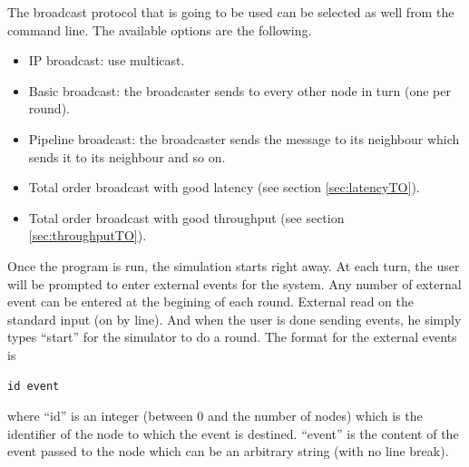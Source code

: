 \documentclass[a4paper]{article}
\begin{document}
The broadcast protocol that is going to be used can be selected as well from
the command line. The available options are the following.
\begin{itemize}
    \item IP broadcast: use multicast.
    \item Basic broadcast: the broadcaster sends to every other node in turn
        (one per round).
    \item Pipeline broadcast: the broadcaster sends the message to its neighbour
        which sends it to its neighbour and so on.
    \item Total order broadcast with good latency (see section
        \ref{sec:latencyTO}).
    \item Total order broadcast with good throughput (see section
        \ref{sec:throughputTO}).
\end{itemize}

Once the program is run, the simulation starts right away. At each turn, the
user will be prompted to enter external events for the system. Any number of
external event can be entered at the begining of each round. External read on
the standard input (on by line). And when the user is done sending events, he
simply types ``start'' for the simulator to do a round. The format for the
external events is
\begin{lstlisting}
id event
\end{lstlisting}
where ``id'' is an integer (between 0 and the number of nodes) which is the identifier of the node to which the
event is destined. ``event'' is the content of the event passed to the
node which can be an
arbitrary string (with no line break).
\end{document}
